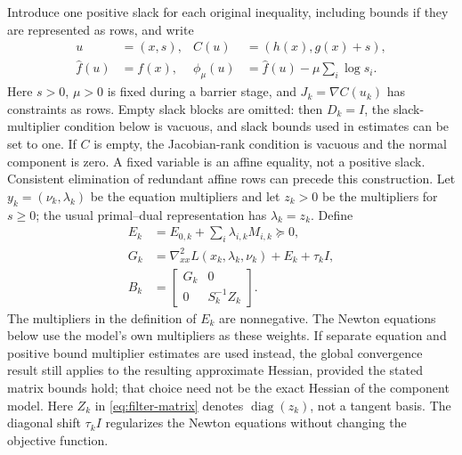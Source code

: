 \documentclass[pdflatex,sn-mathphys-num]{sn-jnl}
\theoremstyle{thmstyleone}
\theoremstyle{thmstylethree}
\newcommand{\diag}{\operatorname{diag}}
\begin{document}
Introduce one positive slack for each original inequality, including
bounds if they are represented as rows, and write
\[
 \begin{aligned}
 u&=(x,s), & C(u)&=(h(x),g(x)+s),\\
 \widehat f(u)&=f(x), &
 \phi_\mu(u)&=\widehat f(u)-\mu\sum_i\log s_i .
 \end{aligned}
\]
Here $s>0$, $\mu>0$ is fixed during a barrier stage, and
$J_k=\nabla C(u_k)$ has constraints as rows.
Empty slack blocks are omitted: then $D_k=I$, the slack-multiplier
condition below is vacuous, and slack bounds used in estimates
can be set to one. If $C$ is empty, the Jacobian-rank condition is
vacuous and the normal component is zero. A fixed variable is
an affine equality, not a positive slack. Consistent elimination of
redundant affine rows can precede this construction.
Let $y_k=(\nu_k,\lambda_k)$ be the equation multipliers and let
$z_k>0$ be the multipliers for $s\geq0$; the usual primal--dual
representation has $\lambda_k=z_k$. Define
\begin{equation}
 \begin{aligned}
 E_k&=E_{0,k}+\sum_i\lambda_{i,k}M_{i,k}\succeq0,\\
 G_k&=\nabla^2_{xx}L(x_k,\lambda_k,\nu_k)+E_k+\tau_k I,\\
 B_k&=\begin{bmatrix}G_k&0\\0&S_k^{-1}Z_k\end{bmatrix}.
 \end{aligned}
 \label{eq:filter-matrix}
\end{equation}
The multipliers in the definition of $E_k$ are nonnegative.
The Newton equations below use the model's own multipliers as these
weights.
If separate equation and positive bound multiplier estimates are
used instead, the global convergence result still applies to the resulting
approximate Hessian, provided the stated matrix bounds hold;
that choice need not be the exact Hessian of the component model. Here $Z_k$ in
\eqref{eq:filter-matrix} denotes $\diag(z_k)$, not a tangent basis.
The diagonal shift $\tau_k I$ regularizes the Newton equations without
changing the objective function.
\end{document}
